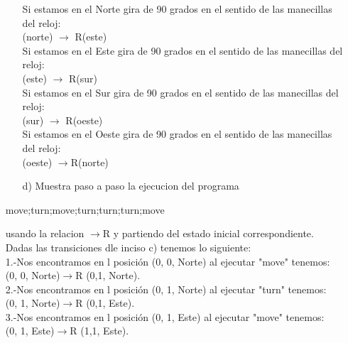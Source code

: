 \documentclass{article}
\begin{document}
\begin{itemize}
\begin{itemize}
                    Si estamos en el Norte gira de 90 grados en el sentido de las manecillas del reloj:\\
                    (norte) $\rightarrow$ R(este)\\
                    Si estamos en el Este gira de 90 grados en el sentido de las manecillas del reloj:\\
                    (este) $\rightarrow$ R(sur)\\
                    Si estamos en el Sur gira de 90 grados en el sentido de las manecillas del reloj:\\
                    (sur) $\rightarrow$ R(oeste)\\
                    Si estamos en el Oeste gira de 90 grados en el sentido de las manecillas del reloj:\\
                    (oeste) $\rightarrow$R(norte)\\
                    
                    \item[d)] Muestra paso a paso la ejecucion del programa\\
                    
                \end{itemize}
                \begin{center}
                    move;turn;move;turn;turn;turn;move
                \end{center}
            usando la relacion $\rightarrow$R y partiendo del estado inicial correspondiente.\\

            Dadas las transiciones dle inciso c) tenemos lo siguiente:\\

            1.-Nos encontramos en l posición (0, 0, Norte) al ejecutar "move" tenemos:\\
            (0, 0, Norte)$\rightarrow$R (0,1, Norte).\\

            2.-Nos encontramos en l posición (0, 1, Norte) al ejecutar "turn" tenemos:\\
            (0, 1, Norte)$\rightarrow$R (0,1, Este).\\

            3.-Nos encontramos en l posición (0, 1, Este) al ejecutar "move" tenemos:\\
            (0, 1, Este)$\rightarrow$R (1,1, Este).\\


\end{itemize}
\end{document}
